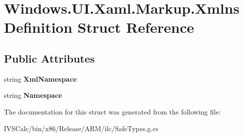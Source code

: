 \hypertarget{struct_windows_1_1_u_i_1_1_xaml_1_1_markup_1_1_xmlns_definition}{}\section{Windows.\+U\+I.\+Xaml.\+Markup.\+Xmlns\+Definition Struct Reference}
\label{struct_windows_1_1_u_i_1_1_xaml_1_1_markup_1_1_xmlns_definition}
\subsection*{Public Attributes}
\begin{DoxyCompactItemize}
\item 
\mbox{\label{struct_windows_1_1_u_i_1_1_xaml_1_1_markup_1_1_xmlns_definition_ab8a5bf1e000f93883846a2fe7af4ba19}} 
string {\bfseries Xml\+Namespace}
\item 
\mbox{\label{struct_windows_1_1_u_i_1_1_xaml_1_1_markup_1_1_xmlns_definition_a7d9fec87c35a13236145878f36e1d347}} 
string {\bfseries Namespace}
\end{DoxyCompactItemize}


The documentation for this struct was generated from the following file\+:\begin{DoxyCompactItemize}
\item 
I\+V\+S\+Calc/bin/x86/\+Release/\+A\+R\+M/ilc/Safe\+Types.\+g.\+cs\end{DoxyCompactItemize}
